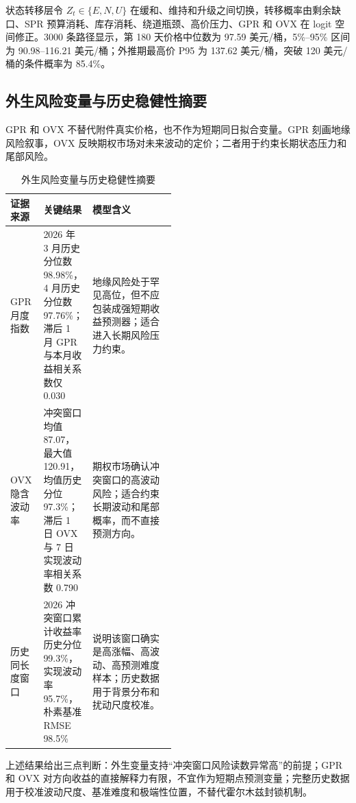 状态转移层令 \(Z_t\in\{E,N,U\}\) 在缓和、维持和升级之间切换，转移概率由剩余缺口、SPR 预算消耗、库存消耗、绕道瓶颈、高价压力、GPR 和 OVX 在 logit 空间修正。3000 条路径显示，第 180 天价格中位数为 97.59 美元/桶，5\%--95\% 区间为 90.98--116.21 美元/桶；外推期最高价 P95 为 137.62 美元/桶，突破 120 美元/桶的条件概率为 85.4\%。

\subsection{外生风险变量与历史稳健性摘要}

GPR 和 OVX 不替代附件真实价格，也不作为短期同日拟合变量。GPR 刻画地缘风险叙事，OVX 反映期权市场对未来波动的定价；二者用于约束长期状态压力和尾部风险。

\begin{table}[H]
\centering
\caption{外生风险变量与历史稳健性摘要}
\begin{tabularx}{\linewidth}{p{0.20\linewidth}p{0.28\linewidth}X}
\toprule
证据来源 & 关键结果 & 模型含义 \\
\midrule
GPR 月度指数 & 2026 年 3 月历史分位数 98.98\%，4 月历史分位数 97.76\%；滞后 1 月 GPR 与本月收益相关系数仅 0.030 & 地缘风险处于罕见高位，但不应包装成强短期收益预测器；适合进入长期风险压力约束。 \\
OVX 隐含波动率 & 冲突窗口均值 87.07，最大值 120.91，均值历史分位 97.3\%；滞后 1 日 OVX 与 7 日实现波动率相关系数 0.790 & 期权市场确认冲突窗口的高波动风险；适合约束长期波动和尾部概率，而不直接预测方向。 \\
历史同长度窗口 & 2026 冲突窗口累计收益率历史分位 99.3\%，实现波动率 95.7\%，朴素基准 RMSE 98.5\% & 说明该窗口确实是高涨幅、高波动、高预测难度样本；历史数据用于背景分布和扰动尺度校准。 \\
\bottomrule
\end{tabularx}
\end{table}

\FloatBarrier

上述结果给出三点判断：外生变量支持“冲突窗口风险读数异常高”的前提；GPR 和 OVX 对方向收益的直接解释力有限，不宜作为短期点预测变量；完整历史数据用于校准波动尺度、基准难度和极端性位置，不替代霍尔木兹封锁机制。
